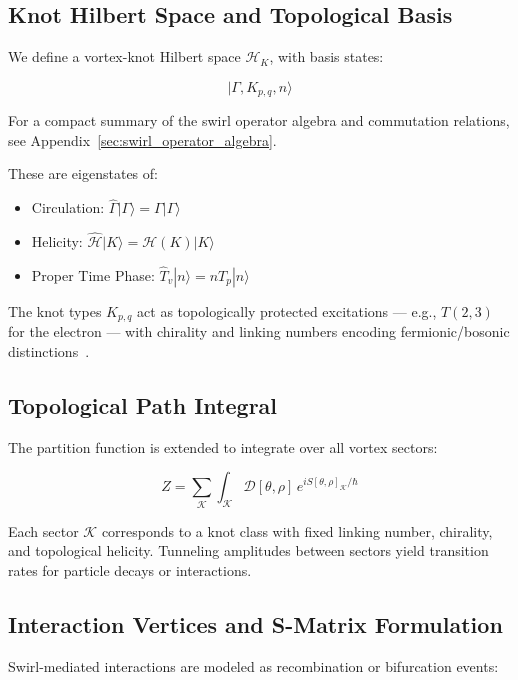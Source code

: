 \documentclass[preprint]{revtex4-2}
\begin{document}
    \subsection{Knot Hilbert Space and Topological Basis}
    We define a vortex-knot Hilbert space \( \mathcal{H}_K \), with basis states:

    \begin{equation}
    | \Gamma, K_{p,q}, n \rangle
    \end{equation}

    For a compact summary of the swirl operator algebra and commutation relations, see Appendix~\ref{sec:swirl_operator_algebra}.

    These are eigenstates of:

    \begin{itemize}
        \item Circulation: \( \hat{\Gamma} | \Gamma \rangle = \Gamma | \Gamma \rangle \)
        \item Helicity: \( \hat{\mathcal{H}} | K \rangle = \mathcal{H}(K) | K \rangle \)
        \item Proper Time Phase: \( \hat{T}_v | n \rangle = n T_p | n \rangle \)
    \end{itemize}

    The knot types \( K_{p,q} \) act as topologically protected excitations — e.g., \( T(2,3) \) for the electron — with chirality and linking numbers encoding fermionic/bosonic distinctions~\cite{kleckner2013creation}.

    \subsection{Topological Path Integral}
    The partition function is extended to integrate over all vortex sectors:

    \begin{equation}
    Z = \sum_{\mathcal{K}} \int_{\mathcal{K}} \mathcal{D}[\theta, \rho] \, e^{i S[\theta, \rho]_{\mathcal{K}} / \hbar}
    \end{equation}

    Each sector \( \mathcal{K} \) corresponds to a knot class with fixed linking number, chirality, and topological helicity. Tunneling amplitudes between sectors yield transition rates for particle decays or interactions.

    \subsection{Interaction Vertices and S-Matrix Formulation}
    Swirl-mediated interactions are modeled as recombination or bifurcation events:
\end{document}
